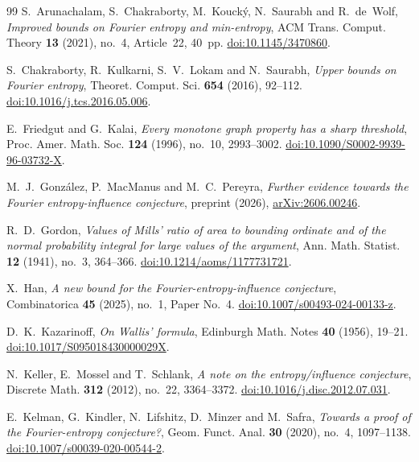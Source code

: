 \documentclass[11pt]{amsart}
\theoremstyle{remark}
\begin{document}
\begin{thebibliography}{99}
S.~Arunachalam, S.~Chakraborty, M.~Kouck\'y, N.~Saurabh and R.~de~Wolf,
\emph{Improved bounds on Fourier entropy and min-entropy},
ACM Trans. Comput. Theory \textbf{13} (2021), no.~4, Article~22, 40~pp.
\href{https://doi.org/10.1145/3470860}{doi:10.1145/3470860}.

S.~Chakraborty, R.~Kulkarni, S.~V.~Lokam and N.~Saurabh,
\emph{Upper bounds on Fourier entropy},
Theoret. Comput. Sci. \textbf{654} (2016), 92--112.
\href{https://doi.org/10.1016/j.tcs.2016.05.006}{doi:10.1016/j.tcs.2016.05.006}.

E.~Friedgut and G.~Kalai,
\emph{Every monotone graph property has a sharp threshold},
Proc. Amer. Math. Soc. \textbf{124} (1996), no.~10, 2993--3002.
\href{https://doi.org/10.1090/S0002-9939-96-03732-X}{doi:10.1090/S0002-9939-96-03732-X}.

M.~J.~Gonz\'alez, P.~MacManus and M.~C.~Pereyra,
\emph{Further evidence towards the Fourier entropy-influence conjecture},
preprint (2026), \href{https://arxiv.org/abs/2606.00246}{arXiv:2606.00246}.

R.~D.~Gordon,
\emph{Values of Mills' ratio of area to bounding ordinate and of the normal probability integral for large values of the argument},
Ann. Math. Statist. \textbf{12} (1941), no.~3, 364--366.
\href{https://doi.org/10.1214/aoms/1177731721}{doi:10.1214/aoms/1177731721}.

X.~Han,
\emph{A new bound for the Fourier-entropy-influence conjecture},
Combinatorica \textbf{45} (2025), no.~1, Paper No.~4.
\href{https://doi.org/10.1007/s00493-024-00133-z}{doi:10.1007/s00493-024-00133-z}.

D.~K.~Kazarinoff,
\emph{On Wallis' formula},
Edinburgh Math. Notes \textbf{40} (1956), 19--21.
\href{https://doi.org/10.1017/S095018430000029X}{doi:10.1017/S095018430000029X}.

N.~Keller, E.~Mossel and T.~Schlank,
\emph{A note on the entropy/influence conjecture},
Discrete Math. \textbf{312} (2012), no.~22, 3364--3372.
\href{https://doi.org/10.1016/j.disc.2012.07.031}{doi:10.1016/j.disc.2012.07.031}.

E.~Kelman, G.~Kindler, N.~Lifshitz, D.~Minzer and M.~Safra,
\emph{Towards a proof of the Fourier-entropy conjecture?},
Geom. Funct. Anal. \textbf{30} (2020), no.~4, 1097--1138.
\href{https://doi.org/10.1007/s00039-020-00544-2}{doi:10.1007/s00039-020-00544-2}.


\end{thebibliography}
\end{document}
